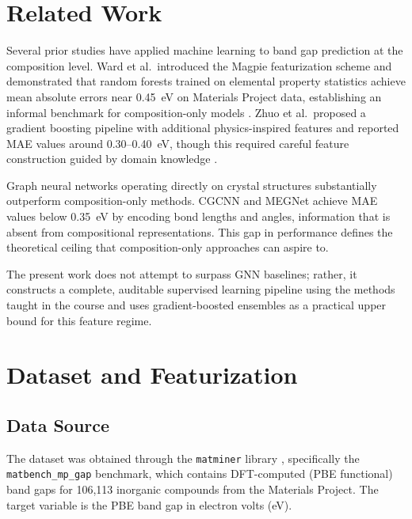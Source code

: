 \documentclass[conference]{IEEEtran}
\begin{document}
\section{Related Work}

Several prior studies have applied machine learning to band gap prediction at the composition level. Ward et al.\ introduced the Magpie featurization scheme and demonstrated that random forests trained on elemental property statistics achieve mean absolute errors near 0.45~eV on Materials Project data, establishing an informal benchmark for composition-only models \cite{ward2016}. Zhuo et al.\ proposed a gradient boosting pipeline with additional physics-inspired features and reported MAE values around 0.30--0.40~eV, though this required careful feature construction guided by domain knowledge \cite{zhuo2018}.

Graph neural networks operating directly on crystal structures substantially outperform composition-only methods. CGCNN \cite{xie2018} and MEGNet \cite{chen2019} achieve MAE values below 0.35~eV by encoding bond lengths and angles, information that is absent from compositional representations. This gap in performance defines the theoretical ceiling that composition-only approaches can aspire to.

The present work does not attempt to surpass GNN baselines; rather, it constructs a complete, auditable supervised learning pipeline using the methods taught in the course and uses gradient-boosted ensembles as a practical upper bound for this feature regime.

\section{Dataset and Featurization}

\subsection{Data Source}

The dataset was obtained through the \texttt{matminer} library \cite{ward2018matminer}, specifically the \texttt{matbench\_mp\_gap} benchmark, which contains DFT-computed (PBE functional) band gaps for 106,113 inorganic compounds from the Materials Project. The target variable is the PBE band gap in electron volts (eV).
\end{document}
